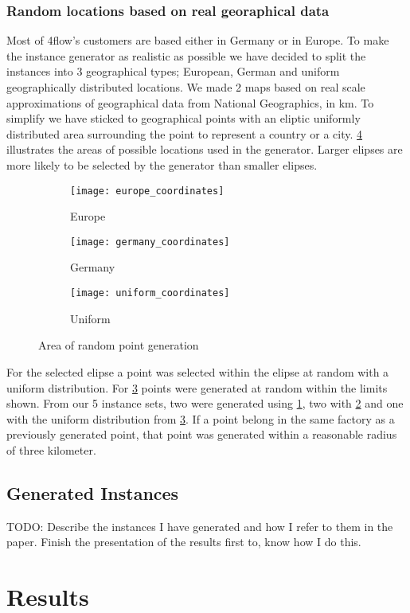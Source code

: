 \documentclass[../main.tex]{subfiles}
\begin{document}
\subsubsection{Random locations based on real georaphical data}
Most of 4flow's customers are based either in Germany or in Europe. 
To make the instance generator as realistic as possible we have decided to split the instances into 3 geographical types; 
European, German and uniform geographically distributed locations.
We made 2 maps based on real scale approximations of geographical data from National Geographics, in km.
To simplify we have sticked to geographical points with an eliptic uniformly distributed area surrounding the point to represent a country or a city.
\ref{fig:areas} illustrates the areas of possible locations used in the generator. 
Larger elipses are more likely to be selected by the generator than smaller elipses.
\begin{figure}
\centering
    \begin{subfigure}[b]{0.3\textwidth}
        \centering
        \texttt{[image: europe\_coordinates]}
        \caption{Europe}
        \label{fig:eur}
    \end{subfigure}
    \hfill
    \begin{subfigure}[b]{0.3\textwidth}
        \centering
        \texttt{[image: germany\_coordinates]}
        \caption{Germany}
        \label{fig:ger}
    \end{subfigure}
    \hfill
    \begin{subfigure}[b]{0.3\textwidth}
        \centering
        \texttt{[image: uniform\_coordinates]}
        \caption{Uniform}
        \label{fig:uni}
    \end{subfigure}
    \caption{Area of random point generation}
    \label{fig:areas}
\end{figure}

For the selected elipse a point was selected within the elipse at random with a uniform distribution.
For \ref{fig:uni} points were generated at random within the limits shown.
From our 5 instance sets, two were generated using \ref{fig:eur}, two with \ref{fig:ger} and one with the uniform distribution from \ref{fig:uni}. 
If a point belong in the same factory as a previously generated point, that point was generated within a reasonable radius of three kilometer.

\subsection{Generated Instances}
TODO: Describe the instances I have generated and how I refer to them in the paper. 
Finish the presentation of the results first to, know how I do this.

\section{Results}

\biblio                                                         
\end{document}
